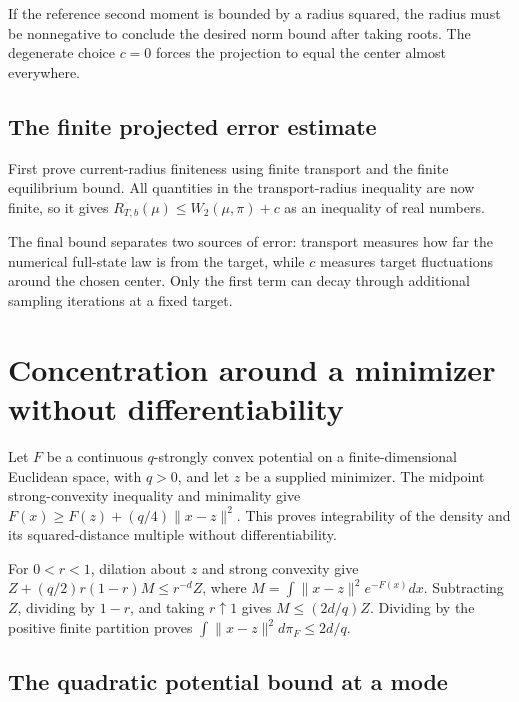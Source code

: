 \documentclass[11pt,a4paper]{report}
\begin{document}
If the reference second moment is bounded by a radius squared, the radius must be nonnegative to conclude the desired norm bound after taking roots. The degenerate choice \(c=0\) forces the projection to equal the center almost everywhere.

\subsection{\texorpdfstring{The finite projected error estimate}{The finite projected error estimate}}
\label{report-step-UnadjustedLangevin-Projection-lean-9}


First prove current-radius finiteness using finite transport and the finite equilibrium bound. All quantities in the transport-radius inequality are now finite, so it gives \(R_{T,b}(\mu)\le W_2(\mu,\pi)+c\) as an inequality of real numbers.



The final bound separates two sources of error: transport measures how far the numerical full-state law is from the target, while \(c\) measures target fluctuations around the chosen center. Only the first term can decay through additional sampling iterations at a fixed target.

\section{\texorpdfstring{Concentration around a minimizer without differentiability}{Concentration around a minimizer without differentiability}}
\label{proof-module-UnadjustedLangevin-GibbsConcentration-lean}


Let \(F\) be a continuous \(q\)-strongly convex potential on a finite-dimensional Euclidean space, with \(q>0\), and let \(z\) be a supplied minimizer. The midpoint strong-convexity inequality and minimality give \(F(x)\ge F(z)+(q/4)\|x-z\|^2\). This proves integrability of the density and its squared-distance multiple without differentiability.



For \(0<r<1\), dilation about \(z\) and strong convexity give \(Z+(q/2)r(1-r)M\le r^{-d}Z\), where \(M=\int\|x-z\|^2e^{-F(x)}dx\). Subtracting \(Z\), dividing by \(1-r\), and taking \(r\uparrow1\) gives \(M\le(2d/q)Z\). Dividing by the positive finite partition proves \(\int\|x-z\|^2d\pi_F\le2d/q\).

\subsection{\texorpdfstring{The quadratic potential bound at a mode}{The quadratic potential bound at a mode}}
\label{report-step-UnadjustedLangevin-GibbsConcentration-lean-1}
\end{document}
